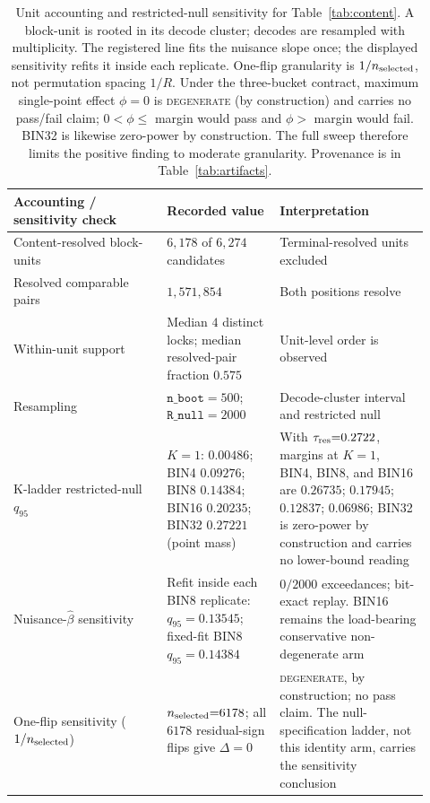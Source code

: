 \documentclass{article}
\begin{document}
\begin{table}[H]
\centering
\small
\setlength{\tabcolsep}{4pt}
\begin{tabular}{@{}>{\raggedright\arraybackslash}p{0.34\linewidth}
                    >{\raggedright\arraybackslash}p{0.25\linewidth}
                    >{\raggedright\arraybackslash}p{0.33\linewidth}@{}}
\toprule
Accounting / sensitivity check & Recorded value & Interpretation \\
\midrule
Content-resolved block-units & $6{,}178$ of $6{,}274$ candidates &
Terminal-resolved units excluded \\
Resolved comparable pairs & $1{,}571{,}854$ & Both positions resolve \\
Within-unit support & Median $4$ distinct locks; median resolved-pair fraction
$0.575$ & Unit-level order is observed \\
Resampling & $\texttt{n\_boot}{=}500$; $\texttt{R\_null}{=}2000$ &
Decode-cluster interval and restricted null \\
K-ladder restricted-null $q_{95}$ & $K{=}1$: $0.00486$; BIN4 $0.09276$;
BIN8 $0.14384$; BIN16 $0.20235$; BIN32 $0.27221$ (point mass) & With
$\tau_{\rm res}{=}0.2722$, margins at $K{=}1$, BIN4, BIN8, and BIN16 are
$0.26735$; $0.17945$; $0.12837$; $0.06986$; BIN32 is zero-power by construction and
carries no lower-bound reading \\
Nuisance-$\hat\beta$ sensitivity & Refit inside each BIN8 replicate:
$q_{95}{=}0.13545$; fixed-fit BIN8 $q_{95}{=}0.14384$ & $0/2000$ exceedances;
bit-exact replay. BIN16 remains the load-bearing conservative non-degenerate arm \\
One-flip sensitivity ($1/n_{\rm selected}$) & $n_{\rm selected}{=}6178$;
all $6178$ residual-sign flips give $\Delta{=}0$ & \textsc{degenerate},
by construction; no pass claim. The null-specification ladder, not this identity
arm, carries the sensitivity conclusion \\
\bottomrule
\end{tabular}
\caption{Unit accounting and restricted-null sensitivity for
Table~\ref{tab:content}. A block-unit is rooted in its decode cluster; decodes are
resampled with multiplicity. The registered line fits the nuisance slope once;
the displayed sensitivity refits it inside each replicate. One-flip granularity
is $1/n_{\rm selected}$, not permutation spacing $1/R$. Under the three-bucket
contract, maximum single-point effect $\phi=0$ is \textsc{degenerate}
(by construction) and carries no pass/fail claim; $0<\phi\le$ margin would pass
and $\phi>$ margin would fail. BIN32 is likewise zero-power by construction.
The full sweep therefore limits the positive finding to moderate granularity.
Provenance is in Table~\ref{tab:artifacts}.}
\label{tab:content-audit}
\end{table}
\end{document}
